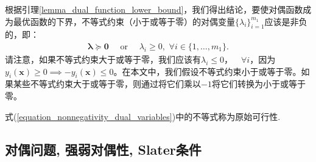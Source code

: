 \documentclass[lang=cn,10pt]{gorgeousnbook}
\numberwithin{equation}{section}%
\numberwithin{figure}{section}%
\begin{document}
\begin{corollary}[不等式的对偶变量的非负性]\label{corollary_nonnegativity_dual_variables}
根据引理\ref{lemma_dual_function_lower_bound}，我们得出结论，要使对偶函数成为最优函数的下界，不等式约束（小于或等于零）的对偶变量$\{\lambda_i\}_{i=1}^{m_1}$应该是非负的，即：
\begin{align}\label{equation_nonnegativity_dual_variables}
\boldsymbol{\lambda} \succeq \boldsymbol{0} \quad\text{ or }\quad \lambda_i \geq 0, \,\, \forall i \in \{1, \dots, m_1\}.
\end{align}
请注意，如果不等式约束大于或等于零，我们应该有$\lambda_i \leq 0，\quad \forall i$，因为$y_i(\boldsymbol{x}) \geq 0 \implies -y_i(\boldsymbol{x}) \leq 0$。在本文中，我们假设不等式约束小于或等于零。如果某些不等式约束大于或等于零，则通过将它们乘以$-1$将它们转换为小于或等于零。
\end{corollary}
式(\ref{equation_nonnegativity_dual_variables})中的不等式称为原始可行性. 

\subsection{对偶问题, 强弱对偶性, Slater条件}\label{section_dual_problem}
\end{document}

